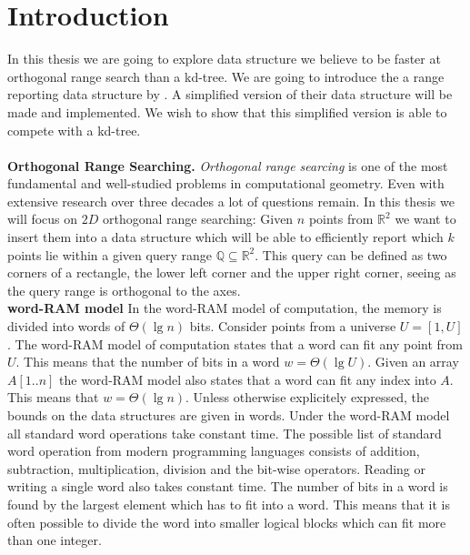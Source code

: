 \chapter{Introduction}
\label{ch:intro}

In this thesis we are going to explore data structure we believe to be faster at orthogonal range search than a kd-tree. We are going to introduce the a range reporting data structure by \citet{chanetal}. A simplified version of their data structure will be made and implemented. We wish to show that this simplified version is able to compete with a kd-tree. \\

 \\

\noindent \textbf{Orthogonal Range Searching.} \emph{Orthogonal range searcing} is one of the most fundamental and well-studied problems in computational geometry. Even with extensive research over three decades a lot of questions remain. In this thesis we will focus on $2D$ orthogonal range searching: Given $n$ points from $\mathbb{R}^2$ we want to insert them into a data structure which will be able to efficiently report which $k$ points lie within a given query range $\mathbb{Q} \subseteq \mathbb{R}^2$. This query can be defined as two corners of a rectangle, the lower left corner and the upper right corner, seeing as the query range is orthogonal to the axes. \\

\noindent \textbf{word-RAM model} In the word-RAM model of computation, the memory is divided into words of $\Theta(\lg n)$ bits. Consider points from a universe $U = [1,U]$. The word-RAM model of computation states that a word can fit any point from $U$. This means that the number of bits in a word $w = \Theta(\lg U)$. Given an array $A[1..n]$ the word-RAM model also states that a word can fit any index into $A$. This means that $w = \Theta(\lg n)$. Unless otherwise explicitely expressed, the bounds on the data structures are given in words. Under the word-RAM model all standard word operations take constant time. The possible list of standard word operation from modern programming languages consists of addition, subtraction, multiplication, division and the bit-wise operators. Reading or writing a single word also takes constant time. The number of bits in a word is found by the largest element which has to fit into a word. This means that it is often possible to divide the word into smaller logical blocks which can fit more than one integer. \\


